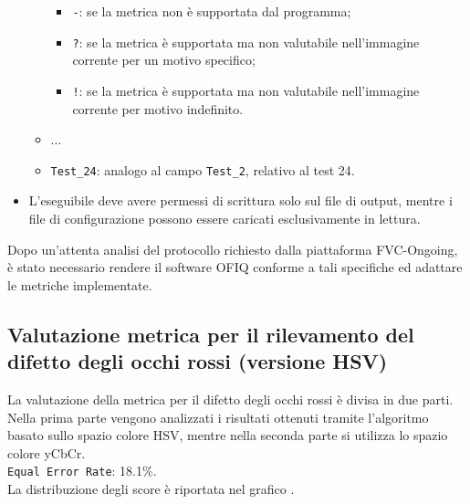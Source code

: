 \documentclass[12pt,a4paper,openright,twoside]{book}
\begin{document}
\begin{itemize}
\begin{itemize}
        \begin{itemize}
            \item \texttt{-}: se la metrica non è supportata dal programma;
            \item \texttt{?}: se la metrica è supportata ma non valutabile nell'immagine corrente per un motivo specifico;
            \item \texttt{!}: se la metrica è supportata ma non valutabile nell'immagine corrente per motivo indefinito.
        \end{itemize}
        \item ...
        \item \texttt{Test\_24}: analogo al campo \texttt{Test\_2}, relativo al test 24.
    \end{itemize}
    \item L'eseguibile deve avere permessi di scrittura solo sul file di output, mentre i file di configurazione possono essere caricati esclusivamente in lettura.
\end{itemize}

Dopo un'attenta analisi del protocollo richiesto dalla piattaforma FVC-Ongoing, è stato necessario rendere il software OFIQ conforme a tali specifiche ed adattare le metriche implementate.

\subsection{Valutazione metrica per il rilevamento del difetto degli occhi rossi (versione HSV)}
La valutazione della metrica per il difetto degli occhi rossi è divisa in due parti. 
Nella prima parte vengono analizzati i risultati ottenuti tramite l'algoritmo basato sullo spazio colore HSV, mentre nella seconda parte si utilizza lo spazio colore yCbCr. \\[4pt]
\texttt{Equal Error Rate}: 18.1\%. \\
La distribuzione degli score è riportata nel grafico . 
\end{document}
